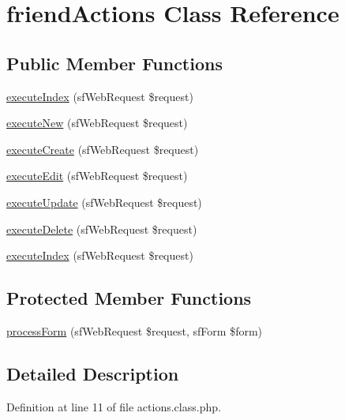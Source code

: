 \hypertarget{classfriend_actions}{\section{friend\-Actions Class Reference}
\label{classfriend_actions}
}
\subsection*{Public Member Functions}
\begin{DoxyCompactItemize}
\item 
\hyperlink{classfriend_actions_a948cc911eb1d9f77990be54af3b2080f}{execute\-Index} (sf\-Web\-Request \$request)
\item 
\hyperlink{classfriend_actions_a0ffbea56560c6c633dae68ec22aff21c}{execute\-New} (sf\-Web\-Request \$request)
\item 
\hyperlink{classfriend_actions_a75837617743fb64dca82d8133b2c662a}{execute\-Create} (sf\-Web\-Request \$request)
\item 
\hyperlink{classfriend_actions_af4d8fedd4b28f3398826a1bb8fa54394}{execute\-Edit} (sf\-Web\-Request \$request)
\item 
\hyperlink{classfriend_actions_af7b4f51862add3c2ebb54efc136a0840}{execute\-Update} (sf\-Web\-Request \$request)
\item 
\hyperlink{classfriend_actions_a52b5b11b11a0070dd2662257520c045a}{execute\-Delete} (sf\-Web\-Request \$request)
\item 
\hyperlink{classfriend_actions_a948cc911eb1d9f77990be54af3b2080f}{execute\-Index} (sf\-Web\-Request \$request)
\end{DoxyCompactItemize}
\subsection*{Protected Member Functions}
\begin{DoxyCompactItemize}
\item 
\hyperlink{classfriend_actions_a7cf661d837626e0320753cbffa019a01}{process\-Form} (sf\-Web\-Request \$request, sf\-Form \$form)
\end{DoxyCompactItemize}


\subsection{Detailed Description}


Definition at line 11 of file actions.\-class.\-php.



